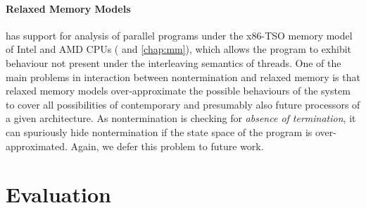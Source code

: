 \paragraph{Relaxed Memory Models}
%
\divine has support for analysis of parallel programs under the x86-TSO memory model of Intel and AMD CPUs ( and \autoref{chap:mm}), which allows the program to exhibit behaviour not present under the interleaving semantics of threads.
One of the main problems in interaction between nontermination and relaxed memory is that relaxed memory models over-approximate the possible behaviours of the system to cover all possibilities of contemporary and presumably also future processors of a given architecture.
As nontermination is checking for \emph{absence of termination}, it can spuriously hide nontermination if the state space of the program is over-approximated.
Again, we defer this problem to future work.

\section{Evaluation} \label{sec:evaluation}

